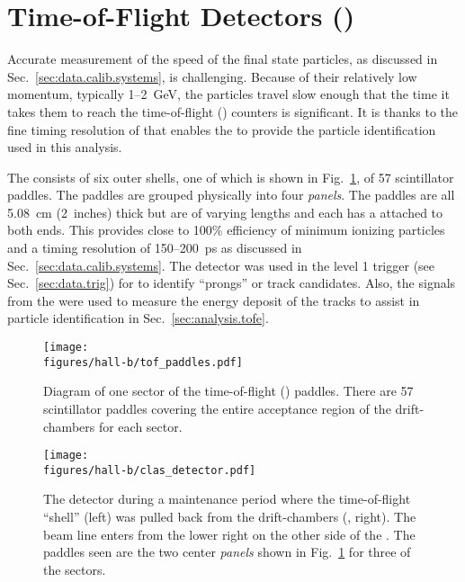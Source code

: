 \section{\label{sec:clas.tof}Time-of-Flight Detectors ()}

Accurate measurement of the speed of the final state particles, as discussed in Sec.~\ref{sec:data.calib.systems}, is challenging. Because of their relatively low momentum, typically 1--2~GeV, the particles travel slow enough that the time it takes them to reach the time-of-flight\cite{clas.tof} () counters is significant. It is thanks to the fine timing resolution of  that enables the  to provide the particle identification used in this analysis.

The  consists of six outer shells, one of which is shown in Fig.~\ref{fig:clas.tof.paddles}, of 57 scintillator paddles. The paddles are grouped physically into four \emph{panels}. The paddles are all 5.08~cm (2~inches) thick but are of varying lengths and each has a  attached to both ends. This provides close to 100\% efficiency of minimum ionizing particles and a timing resolution of 150--200~ps as discussed in Sec.~\ref{sec:data.calib.systems}. The  detector was used in the level 1 trigger (see Sec.~\ref{sec:data.trig}) for  to identify ``prongs'' or track candidates. Also, the  signals from the  were used to measure the energy deposit of the tracks to assist in particle identification in Sec.~\ref{sec:analysis.tofe}.

\begin{figure}\begin{center}
\texttt{[image: \\figures/hall-b/tof\_paddles.pdf]}
\caption[Time-of-Flight Paddles]{\label{fig:clas.tof.paddles}Diagram of one sector of the time-of-flight () paddles. There are 57 scintillator paddles covering the entire acceptance region of the drift-chambers for each sector.}
\end{center}\end{figure}

\begin{figure}\begin{center}
\texttt{[image: \\figures/hall-b/clas\_detector.pdf]}
\caption[ Detector (photograph)]{\label{fig:clas.photo}The  detector during a maintenance period where the time-of-flight ``shell'' (left) was pulled back from the drift-chambers (, right). The beam line enters from the lower right on the other side of the . The  paddles seen are the two center \emph{panels} shown in Fig.~\ref{fig:clas.tof.paddles} for three of the  sectors.}
\end{center}\end{figure}

